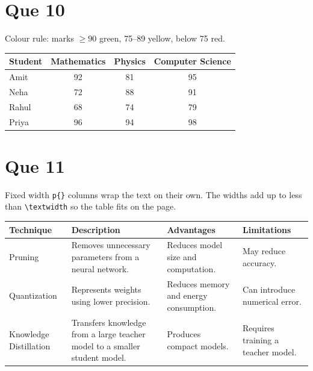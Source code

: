 \documentclass[11pt,a4paper]{article}
\newcommand{\hi}[1]{\cellcolor{good}#1}
\newcommand{\md}[1]{\cellcolor{avg}#1}
\newcommand{\lo}[1]{\cellcolor{poor}#1}
\begin{document}
\section*{Que 10}
Colour rule: marks $\ge 90$ green, 75--89 yellow, below 75 red.
\begin{center}
\begin{tabular}{|l|c|c|c|}
    \hline
    \textbf{Student} & \textbf{Mathematics} & \textbf{Physics} & \textbf{Computer Science} \\
    \hline
    Amit  & \hi{92}  & \md{81} & \hi{95}  \\ \hline
    Neha  & \lo{72}  & \md{88} & \hi{91}  \\ \hline
    Rahul & \lo{68}  & \lo{74}  & \md{79} \\ \hline
    Priya & \hi{96}  & \hi{94}  & \hi{98}  \\ \hline
\end{tabular}
\end{center}

\section*{Que 11}
Fixed width \texttt{p\{\}} columns wrap the text on their own. The widths add up
to less than \verb|\textwidth| so the table fits on the page.
\begin{center}
\renewcommand{\arraystretch}{1.3}
\begin{tabular}{|>{\raggedright\arraybackslash}p{2.6cm}
                |>{\raggedright\arraybackslash}p{4cm}
                |>{\raggedright\arraybackslash}p{3.6cm}
                |>{\raggedright\arraybackslash}p{3.6cm}|}
    \hline
    \textbf{Technique} & \textbf{Description} & \textbf{Advantages} & \textbf{Limitations} \\
    \hline
    Pruning & Removes unnecessary parameters from a neural network.
            & Reduces model size and computation.
            & May reduce accuracy. \\
    \hline
    Quantization & Represents weights using lower precision.
                 & Reduces memory and energy consumption.
                 & Can introduce numerical error. \\
    \hline
    Knowledge Distillation & Transfers knowledge from a large teacher model to a smaller student model.
                           & Produces compact models.
                           & Requires training a teacher model. \\
    \hline
\end{tabular}
\end{center}
\end{document}
